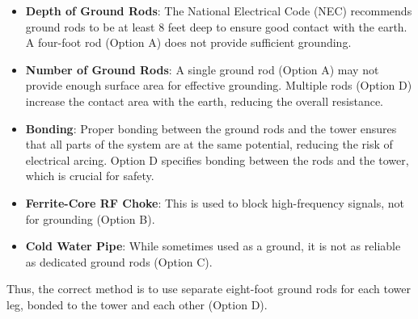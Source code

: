 \begin{itemize}
    \item \textbf{Depth of Ground Rods}: The National Electrical Code (NEC) recommends ground rods to be at least 8 feet deep to ensure good contact with the earth. A four-foot rod (Option A) does not provide sufficient grounding.
    \item \textbf{Number of Ground Rods}: A single ground rod (Option A) may not provide enough surface area for effective grounding. Multiple rods (Option D) increase the contact area with the earth, reducing the overall resistance.
    \item \textbf{Bonding}: Proper bonding between the ground rods and the tower ensures that all parts of the system are at the same potential, reducing the risk of electrical arcing. Option D specifies bonding between the rods and the tower, which is crucial for safety.
    \item \textbf{Ferrite-Core RF Choke}: This is used to block high-frequency signals, not for grounding (Option B).
    \item \textbf{Cold Water Pipe}: While sometimes used as a ground, it is not as reliable as dedicated ground rods (Option C).
\end{itemize}

Thus, the correct method is to use separate eight-foot ground rods for each tower leg, bonded to the tower and each other (Option D).

